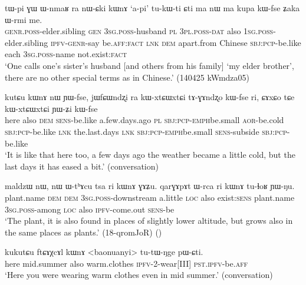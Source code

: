    \begin{exe}
\ex \label{ex:nWCki.kWnA}
\gll  tɯ-pi ɣɯ ɯ-nmaʁ ra nɯ-ɕki kɯnɤ `a-pi' tu-kɯ-ti ɕti ma nɯ ma kupa kɯ-fse ʑaka ɯ-rmi me.\\
\textsc{genr}.\textsc{poss}-elder.sibling \textsc{gen} \textsc{3sg}.\textsc{poss}-husband \textsc{pl} \textsc{3pl}.\textsc{poss}-\textsc{dat} also \textsc{1sg}.\textsc{poss}-elder.sibling \textsc{ipfv}-\textsc{genr}-say be.\textsc{aff}:\textsc{fact} \textsc{lnk} \textsc{dem} apart.from Chinese \textsc{sbj}:\textsc{pcp}-be.like each \textsc{3sg}.\textsc{poss}-name not.exist:\textsc{fact}\\
\glt  `One calls one's sister's husband [and others from his family] `my elder brother', there are no other special terms as in Chinese.' (140425 kWmdza05)
\end{exe}


  \begin{exe}
\ex \label{ex:kutCu.kWnA}
\gll  kutɕu kɯnɤ nɯ ɲɯ-fse, jɯfɕɯndʐi ra kɯ-xtɕɯ\redp{}xtɕi tɤ-ɣɤndʐo kɯ-fse ri, ɕɤxɕo tɕe kɯ-xtɕɯ\redp{}xtɕi ɲɯ-ʑi kɯ-fse \\
here also \textsc{dem} \textsc{sens}-be.like a.few.days.ago \textsc{pl} \textsc{sbj}:\textsc{pcp}-\textsc{emph}\redp{}be.small \textsc{aor}-be.cold \textsc{sbj}:\textsc{pcp}-be.like \textsc{lnk} the.last.days \textsc{lnk} \textsc{sbj}:\textsc{pcp}-\textsc{emph}\redp{}be.small \textsc{sens}-subside \textsc{sbj}:\textsc{pcp}-be.like \\
\glt `It is like that here too, a few days ago the weather became a little cold, but the last days it has eased a bit.' (conversation)
  \end{exe}
  
    \begin{exe}
\ex \label{ex:ri.kWnA}
\gll   maldzɯ nɯ, nɯ ɯ-tʰɤcu tsa ri kɯnɤ ɣɤʑu. qarɣɤpɤt ɯ-rca ri kɯnɤ tu-ɬoʁ ɲɯ-ŋu. \\
plant.name \textsc{dem} \textsc{dem} \textsc{3sg}.\textsc{poss}-downstream a.little \textsc{loc} also exist:\textsc{sens} plant.name \textsc{3sg}.\textsc{poss}-among \textsc{loc} also \textsc{ipfv}-come.out \textsc{sens}-be \\
\glt `The  plant, it is also found in places of slightly lower altitude, but grows also in the same places as   plants.' (18-qromJoR)
()
    \end{exe}
    
\begin{exe}
\ex \label{ex:ftCAXcAl.kWnA}
\gll   kukutɕu ftɕɤχcɤl kɯnɤ <baonuanyi> tu-tɯ-ŋge pɯ-ɕti. \\
  here mid.summer also warm.clothes \textsc{ipfv}-2-wear[III] \textsc{pst}.\textsc{ipfv}-be.\textsc{aff} \\
  \glt `Here you were wearing warm clothes even in mid summer.' (conversation)
    \end{exe}
    
